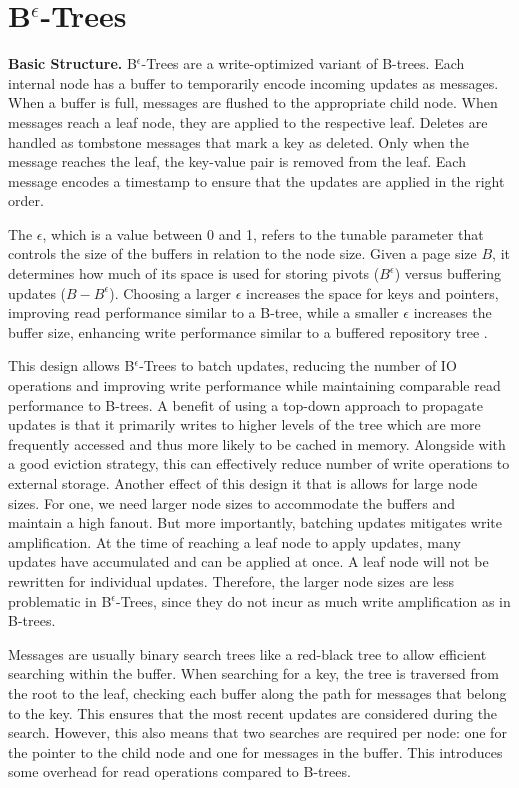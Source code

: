 \section{B$^\epsilon$-Trees}
\textbf{Basic Structure.}
B$^\epsilon$-Trees \cite{bender2015epsilon} are a write-optimized variant of B-trees.
Each internal node has a buffer to temporarily encode incoming updates as messages.
When a buffer is full, messages are flushed to the appropriate child node.
When messages reach a leaf node, they are applied to the respective leaf.
Deletes are handled as tombstone messages that mark a key as deleted. Only when the message reaches the leaf, the key-value pair is removed from the leaf.
Each message encodes a timestamp to ensure that the updates are applied in the right order.

The $\epsilon$, which is a value between 0 and 1, refers to the tunable parameter that controls the size of the buffers in relation to the node size.
Given a page size $B$, it determines how much of its space is used for storing pivots ($B^\epsilon$) versus buffering updates ($B - B^\epsilon$).
Choosing a larger $\epsilon$ increases the space for keys and pointers, improving read performance similar to a B-tree, while a smaller $\epsilon$ increases the buffer size, enhancing write performance similar to a buffered repository tree \cite{buchsbaum2000external}.

This design allows B$^\epsilon$-Trees to batch updates, reducing the number of \ac{IO} operations and improving write performance while maintaining comparable read performance to B-trees.
A benefit of using a top-down approach to propagate updates is that it primarily writes to higher levels of the tree which are more frequently accessed and thus more likely to be cached in memory.
Alongside with a good eviction strategy, this can effectively reduce number of write operations to external storage.
Another effect of this design it that is allows for large node sizes.
For one, we need larger node sizes to accommodate the buffers and maintain a high fanout.
But more importantly, batching updates mitigates write amplification.
At the time of reaching a leaf node to apply updates, many updates have accumulated and can be applied at once. 
A leaf node will not be rewritten for individual updates. 
Therefore, the larger node sizes are less problematic in B$^\epsilon$-Trees, since they do not incur as much write amplification as in B-trees.

Messages are usually binary search trees like a red-black tree to allow efficient searching within the buffer.
When searching for a key, the tree is traversed from the root to the leaf, checking each buffer along the path for messages that belong to the key.
This ensures that the most recent updates are considered during the search.
However, this also means that two searches are required per node: one for the pointer to the child node and one for messages in the buffer.
This introduces some overhead for read operations compared to B-trees.

